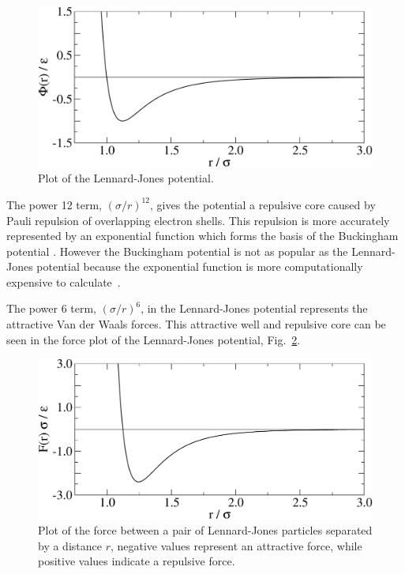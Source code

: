 \documentclass[12pt]{UoAthesis} \usepackage{booktabs}
\begin{document}
\begin{figure}[htp] 
  \begin{center}
    \includegraphics[clip,scale=0.45]{figures/ljPlot} 
    \caption[Lennard-Jones potential]{\label{fig:ljPot} Plot of the Lennard-Jones potential.}
  \end{center}
\end{figure}

The power 12 term, $\left(\sigma/r\right)^{12}$, gives the potential a
repulsive core caused by Pauli repulsion of overlapping electron
shells.  This repulsion is more accurately represented by an
exponential function which forms the basis of the Buckingham potential
\cite{Buckingham1938}.  However the Buckingham potential is not as
popular as the Lennard-Jones potential because the exponential
function is more computationally expensive to
calculate~\cite{White1997}.

The power 6 term, $\left(\sigma/r\right)^{6}$, in the Lennard-Jones
potential represents the attractive Van der Waals forces.  This
attractive well and repulsive core can be seen in the force plot 
of the Lennard-Jones potential, Fig.~\ref{fig:ljForce}.

\begin{figure}[htp] 
  \begin{center}
    \includegraphics[clip,scale=0.45]{figures/ljForce} 
    \caption[Lennard-Jones force]{\label{fig:ljForce} Plot of the
      force between a pair of Lennard-Jones particles separated by a
      distance $r$, negative values represent an attractive force,
      while positive values indicate a repulsive force.}
  \end{center}
\end{figure}
\end{document}
